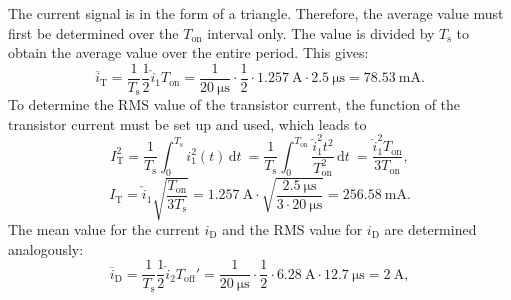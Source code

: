 \begin{solutionblock}
    The current signal is in the form of a triangle. Therefore, the average value must first be determined over the $T_\mathrm{on}$ interval only. The value is divided by $T_\mathrm{s}$ to obtain the average value over the entire period. This gives:
    \begin{equation}
        \overline{i}_\mathrm{T} = \frac{1}{T_\mathrm{s}}\frac{1}{2}\hat i_\mathrm{1}T_\mathrm{on}=\frac{1}{\SI{20}{\micro\s}}\cdot\frac{1}{2}\cdot\SI{1.257}{\ampere}\cdot\SI{2.5}{\micro\s}=\SI{78.53}{\milli\ampere}.
    \end{equation}
    To determine the RMS value of the transistor current, the function of the transistor current must be set up and used, which leads to
    \begin{equation}
        I_\mathrm{T}^2=\frac{1}{T_\mathrm{s}} \int_{0}^{T_\mathrm{s}} i_\mathrm{1}^2(t) \,\mathrm{d}t \ = \frac{1}{T_\mathrm{s}}\int_{0}^{T_\mathrm{on}} \frac{\hat i_\mathrm{1}^2t^2}{T_\mathrm{on}^2} \,\mathrm{d}t \ =  \frac{\hat i_\mathrm{1}^2T_\mathrm{on}}{3T_\mathrm{on}},
    \end{equation}
    \begin{equation}
        I_\mathrm{T} = \hat i_\mathrm{1} \sqrt{\frac{T_\mathrm{on}}{3T_\mathrm{s}}}= \SI{1.257}{\ampere}\cdot\sqrt{\frac{\SI{2.5}{\micro\s}}{3\cdot\SI{20}{\micro\s}}}= \SI{256.58}{\milli\ampere}.
    \end{equation}
    The mean value for the current $i_\mathrm{D}$ and the RMS value for  $i_\mathrm{D}$ are determined analogously:
    \begin{equation}
        \overline{i}_\mathrm{D} = \frac{1}{T_\mathrm{s}}\frac{1}{2}\hat i_\mathrm{2}T_\mathrm{off}'=\frac{1}{\SI{20}{\micro\s}}\cdot\frac{1}{2}\cdot\SI{6.28}{\ampere}\cdot\SI{12.7}{\micro\s}=\SI{2}{\ampere},
    \end{equation}


\end{solutionblock}
